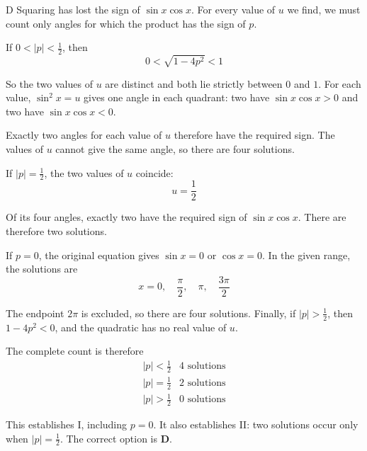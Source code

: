 \documentclass[11pt,a4paper]{article}
\begin{document}
\begin{enumerate}[label=\textbf{\arabic*.},leftmargin=*,itemsep=0pt,start=5]
\begin{djsSolution}{D}
Squaring has lost the sign of $\sin x\cos x$. For every value of $u$ we find, we must count only angles for which the product has the sign of $p$.

If $0<|p|<\tfrac12$, then
\[
0<\sqrt{1-4p^2}<1
\]

So the two values of $u$ are distinct and both lie strictly between $0$ and $1$. For each value, $\sin^2x=u$ gives one angle in each quadrant: two have $\sin x\cos x>0$ and two have $\sin x\cos x<0$.

Exactly two angles for each value of $u$ therefore have the required sign. The values of $u$ cannot give the same angle, so there are four solutions.

If $|p|=\tfrac12$, the two values of $u$ coincide:
\[
u=\frac12
\]

Of its four angles, exactly two have the required sign of $\sin x\cos x$. There are therefore two solutions.

If $p=0$, the original equation gives $\sin x=0$ or $\cos x=0$. In the given range, the solutions are
\[
x=0,\quad \frac\pi2,\quad \pi,\quad \frac{3\pi}{2}
\]

The endpoint $2\pi$ is excluded, so there are four solutions. Finally, if $|p|>\tfrac12$, then $1-4p^2<0$, and the quadratic has no real value of $u$.

The complete count is therefore
\[
\begin{array}{c|c}
|p|<\tfrac12 & 4\text{ solutions}\\[5pt]
|p|=\tfrac12 & 2\text{ solutions}\\[5pt]
|p|>\tfrac12 & 0\text{ solutions}
\end{array}
\]

This establishes I, including $p=0$. It also establishes II: two solutions occur only when $|p|=\tfrac12$. The correct option is \textbf{D}.
\end{djsSolution}
\end{enumerate}
\clearpage
\thispagestyle{djssolutions}
\vspace*{8pt}
\end{document}
